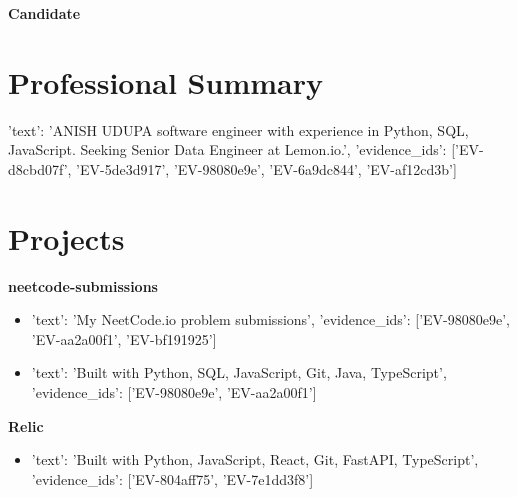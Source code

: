 \documentclass[10pt, letterpaper]{article}
\begin{document}
\begin{center}
    {\huge \bfseries \color{primary} Candidate} \\[4pt]
    \small \color{darkgray}
    
    
    
    
    
\end{center}


\section{Professional Summary}
{'text': 'ANISH UDUPA software engineer with experience in Python, SQL, JavaScript. Seeking Senior Data Engineer at Lemon.io.', 'evidence_ids': ['EV-d8cbd07f', 'EV-5de3d917', 'EV-98080e9e', 'EV-6a9dc844', 'EV-af12cd3b']}







\section{Projects}

    \textbf{\color{primary} neetcode-submissions}  \\
    
    
    \begin{itemize}
    
        \item {'text': 'My NeetCode.io problem submissions', 'evidence_ids': ['EV-98080e9e', 'EV-aa2a00f1', 'EV-bf191925']}
    
        \item {'text': 'Built with Python, SQL, JavaScript, Git, Java, TypeScript', 'evidence_ids': ['EV-98080e9e', 'EV-aa2a00f1']}
    
    \end{itemize}
    
    \vspace{4pt}

    \textbf{\color{primary} Relic}  \\
    
    
    \begin{itemize}
    
        \item {'text': 'Built with Python, JavaScript, React, Git, FastAPI, TypeScript', 'evidence_ids': ['EV-804aff75', 'EV-7e1dd3f8']}
    
    \end{itemize}
    
\end{document}
